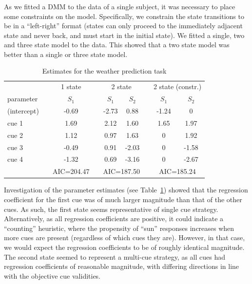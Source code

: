 \documentclass[a4paper,12pt,man]{apa} %
\begin{document}
As we fitted a DMM to the data of a single subject, it was necessary
to place some constraints on the model.  Specifically, we constrain
the state transitions to be in a ``left-right'' format (states can
only proceed to the immediately adjacent state and never back, and
must start in the initial state).  We fitted a single, two and three
state model to the data.  This showed that a two state model was
better than a single or three state model.

\begin{table}
\caption{Estimates for the weather prediction task}
\label{tab:WPT}
\begin{tabular}{lcccccccc} \hline
 & & \multicolumn{1}{c}{1 state} & & \multicolumn{2}{c}{2 state} &&
 \multicolumn{2}{c}{2 state (constr.)} \\ \cline{3-3} \cline{5-6} \cline{8-9}
parameter & & $S_1$ & & $S_1$ & $S_2$ & & $S_1$ & $S_2$ \\ \hline
(intercept) & & -0.69 & & -2.73 & 0.88 & & -1.24 & 0 \\
cue 1 && 1.69 && 2.12 & 1.60 && 1.65 & 1.97 \\
cue 2 && 1.12 && 0.97 & 1.63 && 0 & 1.92 \\
cue 3 && -0.49 && 0.91 & -2.03 && 0 & -1.58 \\
cue 4 && -1.32 && 0.69 & -3.16 && 0 & -2.67 \\ \hline
 & & \multicolumn{1}{c}{AIC=204.47} & & \multicolumn{2}{c}{AIC=187.50} &&
 \multicolumn{2}{c}{AIC=185.24}
\end{tabular}
\end{table}

Investigation of the parameter estimates (see Table~\ref{tab:WPT})
showed that the regression coefficient for the first cue was of much
larger magnitude than that of the other cues.  As such, the first
state seems representative of single cue strategy.  Alternatively, as
all regression coefficients are positive, it could indicate a
``counting'' heuristic, where the propensity of ``sun'' responses
increases when more cues are present (regardless of which cues they
are).  However, in that case, we would expect the regression
coefficients to be of roughly identical magnitude.  The second state
seemed to represent a multi-cue strategy, as all cues had regression
coefficients of reasonable magnitude, with differing directions in
line with the objective cue validities.
\end{document}
